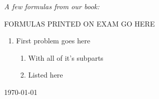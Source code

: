 \bigskip
 
\emph{A few formulas from our book:}

\begin{center}

FORMULAS PRINTED ON EXAM GO HERE

\end{center}

\hspace{-.25in} \hrulefill

\begin{enumerate}
\item First problem goes here
\begin{enumerate}
\item With all of it's subparts
\vfill
\item Listed here
\vfill
\end{enumerate}

\end{enumerate}
\today

